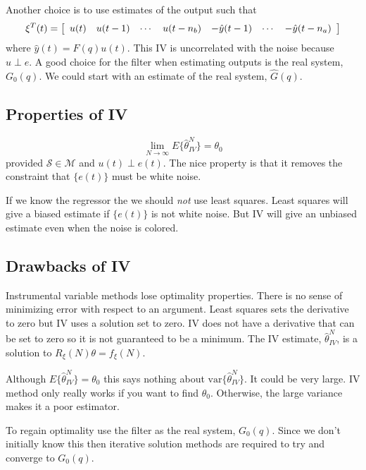 \documentclass[lecture,12pt,]{pcms-l}
\theoremstyle{example}
\newcommand{\thiv}{\hat{\theta}_{IV}^N}
\begin{document}
Another choice is to use estimates of the output such that
$$\xi^T(t) = \left[\begin{array}{c c c c c c c} u(t) & u(t-1) & \cdots & u(t-n_b) & -\hat{y}(t-1) & \cdots & -\hat{y}(t-n_a) \end{array}\right]$$
where $\hat{y}(t)=F(q)u(t)$. This IV is uncorrelated with the noise because $u\perp e$. A good choice for the filter when estimating outputs is the real system, $G_0(q)$. We could start with an estimate of the real system, $\hat{G}(q)$.

\subsection{Properties of IV}
$$\lim_{N\to\infty}E\{\thiv\} = \theta_0$$
provided $\mathcal{S}\in\mathcal{M}$ and $u(t)\perp e(t)$. The nice property is that it removes the constraint that $\{e(t)\}$ must be white noise.

If we know the regressor the we should \textit{not} use least squares. Least squares will give a biased estimate if $\{e(t)\}$ is not white noise. But IV will give an unbiased estimate even when the noise is colored.

\subsection{Drawbacks of IV}
Instrumental variable methods lose optimality properties. There is no sense of minimizing error with respect to an argument. Least squares sets the derivative to zero but IV uses a solution set to zero. IV does not have a derivative that can be set to zero so it is not guaranteed to be a minimum. The IV estimate, $\thiv$, is a solution to $R_\xi(N)\theta=f_\xi(N)$.

Although $E\{\thiv\}=\theta_0$ this says nothing about $\text{var}\{\thiv\}$. It could be very large. IV method only really works if you want to find $\theta_0$. Otherwise, the large variance makes it a poor estimator.

To regain optimality use the filter as the real system, $G_0(q)$. Since we don't initially know this then iterative solution methods are required to try and converge to $G_0(q)$.
\end{document}
